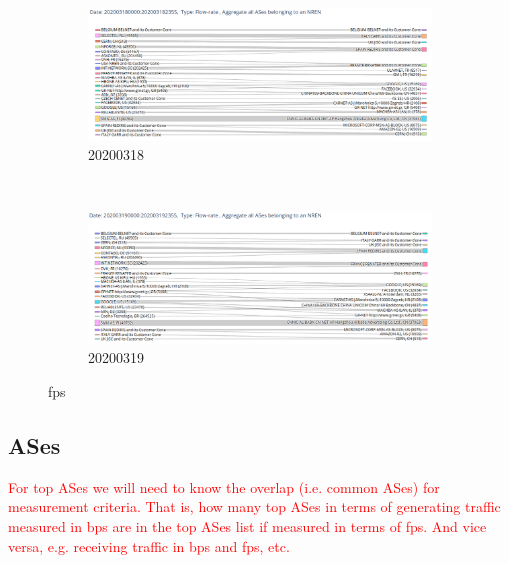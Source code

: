 \documentclass[10pt, journal, letterpaper]{IEEEtran}
\newcommand\boxFigSze{1}
\newcommand{\red}[1]{\textcolor{red}{#1}}
\begin{document}
\begin{figure}
    \begin{subfigure}{\boxFigSze\textwidth}
          \centering
          \includegraphics[width=\columnwidth]{img/sankey_20200318_NRENlevel_fps.png}
          \caption{20200318}
          \label{fig:top_generating_fps}
    \end{subfigure}\\
    \begin{subfigure}{\boxFigSze\textwidth}
          \centering
          \includegraphics[width=\columnwidth]{img/sankey_20200319_NRENlevel_fps.png}
          \caption{20200319}
          \label{fig:top_receiving_fps}
    \end{subfigure}
    \caption{fps}
    \label{fig:sankey_bps}
\end{figure}

\subsection{ASes}

\red{For top ASes we will need to know the overlap (i.e. common ASes) for measurement criteria. That is, how many top ASes in terms of generating traffic measured in bps are in the top ASes list if measured in terms of fps. And vice versa, e.g. receiving traffic in bps and fps, etc.}
\end{document}
